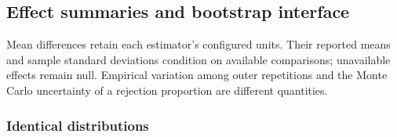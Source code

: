 \documentclass[
  english,
  11pt,
]{article}
\begin{document}
\subsection{Effect summaries and bootstrap
interface}\label{effect-summaries-and-bootstrap-interface}

Mean differences retain each estimator's configured units. Their
reported means and sample standard deviations condition on available
comparisons; unavailable effects remain null. Empirical variation among
outer repetitions and the Monte Carlo uncertainty of a rejection
proportion are different quantities.

\subsubsection{Identical distributions}\label{identical-distributions-2}

\begingroup\small\setlength{\tabcolsep}{8pt}
\end{document}

